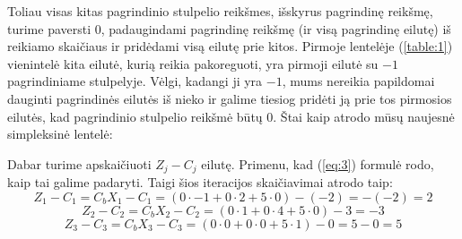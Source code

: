 \documentclass{article}
\begin{document}
Toliau visas kitas pagrindinio stulpelio reikšmes, išskyrus pagrindinę reikšmę, turime paversti 0, padaugindami pagrindinę reikšmę (ir visą pagrindinę eilutę) iš reikiamo skaičiaus ir pridėdami visą eilutę prie kitos. Pirmoje lentelėje (\ref{table:1}) vienintelė kita eilutė, kurią reikia pakoreguoti, yra pirmoji eilutė su $-1$ pagrindiniame stulpelyje. Vėlgi, kadangi ji yra $-1$, mums nereikia papildomai dauginti pagrindinės eilutės iš nieko ir galime tiesiog pridėti ją prie tos pirmosios eilutės, kad pagrindinio stulpelio reikšmė būtų 0. Štai kaip atrodo mūsų naujesnė simpleksinė lentelė:
\begin{table}[H]
    \centering
\end{table}
Dabar turime apskaičiuoti $Z_j-C_j$ eilutę. Primenu, kad (\ref{eq:3}) formulė rodo, kaip tai galime padaryti. Taigi šios iteracijos skaičiavimai atrodo taip:
\begin{equation*}
    Z_1-C_1=C_bX_1-C_1=(0\cdot-1+0\cdot2+5\cdot0)-(-2)=-(-2)=2
\end{equation*}
\begin{equation*}
    Z_2-C_2=C_bX_2-C_2=(0\cdot1+0\cdot4+5\cdot0)-3=-3
\end{equation*}
\begin{equation*}
    Z_3-C_3=C_bX_3-C_3=(0\cdot0+0\cdot0+5\cdot1)-0=5-0=5
\end{equation*}
\end{document}
